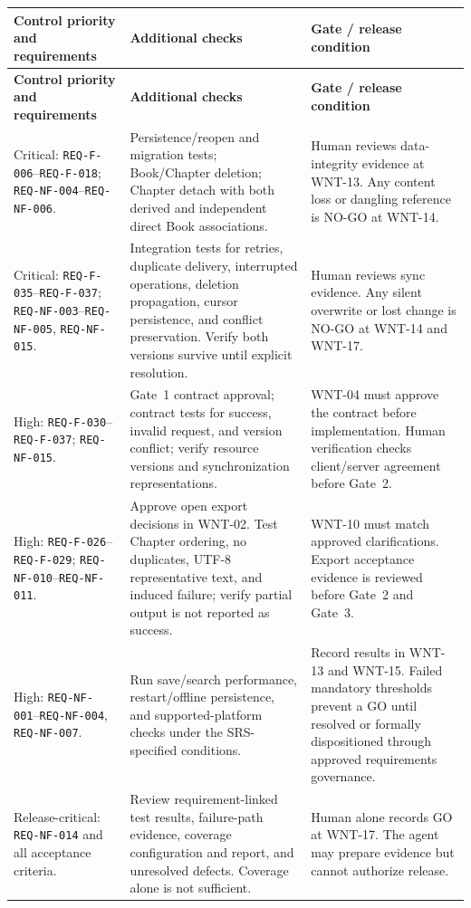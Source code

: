 \documentclass[10pt,a4paper]{article}
\begin{document}
\small
\begin{longtable}{|L{4.0cm}|L{7.0cm}|L{11.5cm}|}
\hline
\textbf{Control priority and requirements} & \textbf{Additional checks} &
\textbf{Gate / release condition} \\
\hline
\endfirsthead
\hline
\textbf{Control priority and requirements} & \textbf{Additional checks} &
\textbf{Gate / release condition} \\
\hline
\endhead

Critical: \texttt{REQ-F-006}--\texttt{REQ-F-018}; \texttt{REQ-NF-004}--\texttt{REQ-NF-006}. &
Persistence/reopen and migration tests; Book/Chapter deletion; Chapter detach with both derived and independent direct Book associations. &
Human reviews data-integrity evidence at WNT-13. Any content loss or dangling reference is NO-GO at WNT-14. \\
\hline

Critical: \texttt{REQ-F-035}--\texttt{REQ-F-037}; \texttt{REQ-NF-003}--\texttt{REQ-NF-005}, \texttt{REQ-NF-015}. &
Integration tests for retries, duplicate delivery, interrupted operations, deletion propagation, cursor persistence, and conflict preservation. Verify both versions survive until explicit resolution. &
Human reviews sync evidence. Any silent overwrite or lost change is NO-GO at WNT-14 and WNT-17. \\
\hline

High: \texttt{REQ-F-030}--\texttt{REQ-F-037}; \texttt{REQ-NF-015}. &
Gate~1 contract approval; contract tests for success, invalid request, and version conflict; verify resource versions and synchronization representations. &
WNT-04 must approve the contract before implementation. Human verification checks client/server agreement before Gate~2. \\
\hline

High: \texttt{REQ-F-026}--\texttt{REQ-F-029}; \texttt{REQ-NF-010}--\texttt{REQ-NF-011}. &
Approve open export decisions in WNT-02. Test Chapter ordering, no duplicates, UTF-8 representative text, and induced failure; verify partial output is not reported as success. &
WNT-10 must match approved clarifications. Export acceptance evidence is reviewed before Gate~2 and Gate~3. \\
\hline

High: \texttt{REQ-NF-001}--\texttt{REQ-NF-004}, \texttt{REQ-NF-007}. &
Run save/search performance, restart/offline persistence, and supported-platform checks under the SRS-specified conditions. &
Record results in WNT-13 and WNT-15. Failed mandatory thresholds prevent a GO until resolved or formally dispositioned through approved requirements governance. \\
\hline

Release-critical: \texttt{REQ-NF-014} and all acceptance criteria. &
Review requirement-linked test results, failure-path evidence, coverage configuration and report, and unresolved defects. Coverage alone is not sufficient. &
Human alone records GO at WNT-17. The agent may prepare evidence but cannot authorize release. \\
\hline
\end{longtable}
\end{document}
